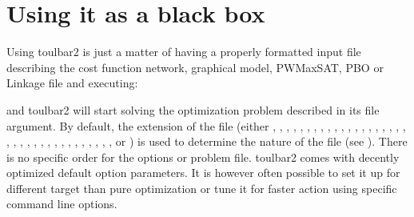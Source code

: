 \documentclass[letterpaper,10pt,openany,oneside,english]{sphinxmanual}
\begin{document}
\section{Using it as a black box}
\label{\detokenize{userdoc:using-it-as-a-black-box}}
\sphinxAtStartPar
Using toulbar2 is just a matter of having a properly formatted input
file describing the cost function network, graphical model, PWMaxSAT,
PBO or Linkage  file and executing:

\begin{sphinxVerbatim}[commandchars=\\\{\}]
 \PYG{p}{[} \PYG{p}{]} 
\end{sphinxVerbatim}

\sphinxAtStartPar
and toulbar2 will start solving the optimization problem described in its file argument. By default, the extension of the file (either , , , , , , , , , , , , , , , , , , , , , , , , , , , , , , , , , , , ,  or ) is used to determine the nature of the file (see {\hyperref[\detokenize{userdoc:input-formats}]{}}).
There is no specific order for the options or problem file. toulbar2 comes with decently optimized default option parameters. It is however often possible to set it up for different target than pure optimization or tune it for faster action using specific command line options.
\end{document}
